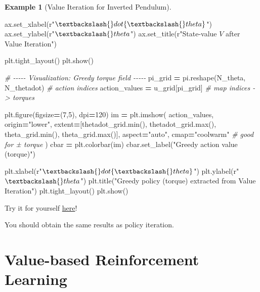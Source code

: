 \documentclass[
]{book}
\newenvironment{Shaded}{\begin{snugshade}}{\end{snugshade}}
\newcommand{\BuiltInTok}[1]{#1}
\newcommand{\CommentTok}[1]{\textcolor[rgb]{0.56,0.35,0.01}{\textit{#1}}}
\newcommand{\DecValTok}[1]{\textcolor[rgb]{0.00,0.00,0.81}{#1}}
\newcommand{\NormalTok}[1]{#1}
\newcommand{\OperatorTok}[1]{\textcolor[rgb]{0.81,0.36,0.00}{\textbf{#1}}}
\newcommand{\StringTok}[1]{\textcolor[rgb]{0.31,0.60,0.02}{#1}}
\newcommand{\VerbatimStringTok}[1]{\textcolor[rgb]{0.31,0.60,0.02}{#1}}
\theoremstyle{definition}
\theoremstyle{definition}
\newtheorem{example}{Example}[chapter]
\theoremstyle{definition}
\theoremstyle{definition}
\theoremstyle{remark}
\begin{document}
\begin{example}[Value Iteration for Inverted Pendulum]
\begin{Shaded}
\begin{Highlighting}[]
\NormalTok{ax.set\_xlabel(}\VerbatimStringTok{r"$\textbackslash{}dot\{\textbackslash{}theta\}$"}\NormalTok{)}
\NormalTok{ax.set\_ylabel(}\VerbatimStringTok{r"$\textbackslash{}theta$"}\NormalTok{)}
\NormalTok{ax.set\_title(}\VerbatimStringTok{r"State{-}value $V$ after Value Iteration"}\NormalTok{)}

\NormalTok{plt.tight\_layout()}
\NormalTok{plt.show()}

\CommentTok{\# {-}{-}{-}{-}{-} Visualization: Greedy torque field {-}{-}{-}{-}{-}}
\NormalTok{pi\_grid }\OperatorTok{=}\NormalTok{ pi.reshape(N\_theta, N\_thetadot)   }\CommentTok{\# action indices}
\NormalTok{action\_values }\OperatorTok{=}\NormalTok{ u\_grid[pi\_grid]             }\CommentTok{\# map indices {-}\textgreater{} torques}

\NormalTok{plt.figure(figsize}\OperatorTok{=}\NormalTok{(}\DecValTok{7}\NormalTok{,}\DecValTok{5}\NormalTok{), dpi}\OperatorTok{=}\DecValTok{120}\NormalTok{)}
\NormalTok{im }\OperatorTok{=}\NormalTok{ plt.imshow(}
\NormalTok{    action\_values,}
\NormalTok{    origin}\OperatorTok{=}\StringTok{"lower"}\NormalTok{,}
\NormalTok{    extent}\OperatorTok{=}\NormalTok{[thetadot\_grid.}\BuiltInTok{min}\NormalTok{(), thetadot\_grid.}\BuiltInTok{max}\NormalTok{(),}
\NormalTok{            theta\_grid.}\BuiltInTok{min}\NormalTok{(), theta\_grid.}\BuiltInTok{max}\NormalTok{()],}
\NormalTok{    aspect}\OperatorTok{=}\StringTok{"auto"}\NormalTok{,}
\NormalTok{    cmap}\OperatorTok{=}\StringTok{"coolwarm"}   \CommentTok{\# good for ± torque}
\NormalTok{)}
\NormalTok{cbar }\OperatorTok{=}\NormalTok{ plt.colorbar(im)}
\NormalTok{cbar.set\_label(}\StringTok{"Greedy action value (torque)"}\NormalTok{)}

\NormalTok{plt.xlabel(}\VerbatimStringTok{r"$\textbackslash{}dot\{\textbackslash{}theta\}$"}\NormalTok{)}
\NormalTok{plt.ylabel(}\VerbatimStringTok{r"$\textbackslash{}theta$"}\NormalTok{)}
\NormalTok{plt.title(}\StringTok{"Greedy policy (torque) extracted from Value Iteration"}\NormalTok{)}
\NormalTok{plt.tight\_layout()}
\NormalTok{plt.show()}
\end{Highlighting}
\end{Shaded}

Try it for yourself \href{https://github.com/ComputationalRobotics/2025-ES-AM-158-LECTURE-CODE/blob/main/pendulum_value_iteration.py}{here}!

You should obtain the same results as policy iteration.
\end{example}

\chapter{Value-based Reinforcement Learning}\label{value-rl}
\end{document}
